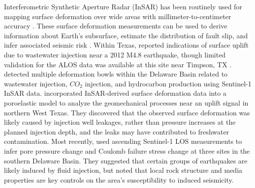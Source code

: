 \documentclass[draft]{agujournal2019}
\begin{document}
Interferometric Synthetic Aperture Radar (InSAR) has been routinely used for mapping surface deformation over wide areas with millimeter-to-centimeter accuracy \cite{Massonnet1993, burgmann2000synthetic}.  These surface deformation measurements can be used to derive information about Earth's subsurface, estimate the distribution of fault slip, and infer associated seismic risk \cite{Segall2010, Elliott2016, huang2017fault}. Within Texas,  reported indications of surface uplift due to wastewater injection near a 2012 M4.8 earthquake, though limited validation for the ALOS data was available at this site near Timpson, TX \cite{semple2017incomplete}.  detected multiple deformation bowls within the Delaware Basin related to wastewater injection, $CO_2$ injection, and hydrocarbon production using Sentinel-1 InSAR data.  incorporated InSAR-derived surface deformation data into a poroelastic model to analyze the geomechanical processes near an uplift signal in northern West Texas. They discovered that the observed surface deformation was likely caused by injection well leakages, rather than pressure increases at the planned injection depth, and the leaks may have contributed to freshwater contamination. Most recently,  used ascending Sentinel-1 LOS measurements to infer pore pressure change and Coulomb failure stress change at three sites in the southern Delaware Basin. They suggested that certain groups of earthquakes are likely induced by fluid injection, but noted that local rock structure and media properties are key controls on the area's susceptibility to induced seismicity.
\end{document}
